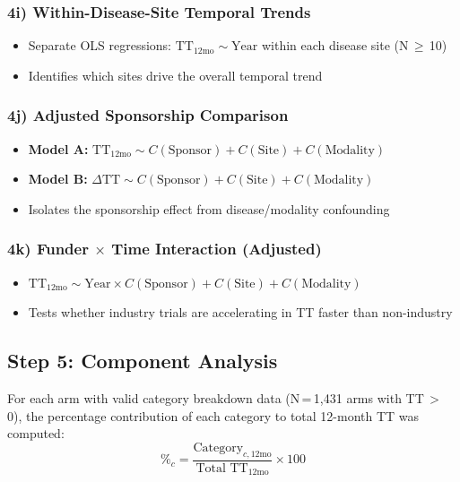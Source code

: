 \documentclass[11pt,a4paper]{article}
\begin{document}
\subsubsection{4i) Within-Disease-Site Temporal Trends}
\begin{itemize}
    \item Separate OLS regressions: $\text{TT}_{\text{12mo}} \sim \text{Year}$ within each disease site (N\,$\geq$\,10)
    \item Identifies which sites drive the overall temporal trend
\end{itemize}

\subsubsection{4j) Adjusted Sponsorship Comparison}
\begin{itemize}
    \item \textbf{Model A:} $\text{TT}_{\text{12mo}} \sim C(\text{Sponsor}) + C(\text{Site}) + C(\text{Modality})$
    \item \textbf{Model B:} $\Delta\text{TT} \sim C(\text{Sponsor}) + C(\text{Site}) + C(\text{Modality})$
    \item Isolates the sponsorship effect from disease/modality confounding
\end{itemize}

\subsubsection{4k) Funder $\times$ Time Interaction (Adjusted)}
\begin{itemize}
    \item $\text{TT}_{\text{12mo}} \sim \text{Year} \times C(\text{Sponsor}) + C(\text{Site}) + C(\text{Modality})$
    \item Tests whether industry trials are accelerating in TT faster than non-industry
\end{itemize}

\subsection{Step 5: Component Analysis}
\label{sec:component_method}

For each arm with valid category breakdown data (N\,=\,1{,}431 arms with TT\,$>$\,0), the percentage contribution of each category to total 12-month TT was computed:
$$\text{\%}_{c} = \frac{\text{Category}_{c,\text{12mo}}}{\text{Total TT}_{\text{12mo}}} \times 100$$
\end{document}
